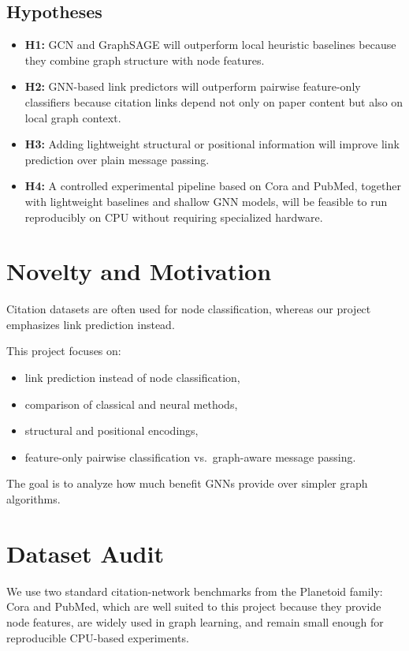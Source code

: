 \documentclass[11pt,a4paper]{article}
\begin{document}
\subsection{Hypotheses}
\begin{itemize}
    \item \textbf{H1:} GCN and GraphSAGE will outperform local heuristic baselines because they combine graph structure with node features.
    \item \textbf{H2:} GNN-based link predictors will outperform pairwise feature-only classifiers because citation links depend not only on paper content but also on local graph context.
    \item \textbf{H3:} Adding lightweight structural or positional information will improve link prediction over plain message passing.
    \item \textbf{H4:} A controlled experimental pipeline based on Cora and PubMed, together with lightweight baselines and shallow GNN models, will be feasible to run reproducibly on CPU without requiring specialized hardware.
\end{itemize}

\section{Novelty and Motivation}

Citation datasets are often used for node classification, whereas our project emphasizes link prediction instead.

This project focuses on:
\begin{itemize}
\item link prediction instead of node classification,
\item comparison of classical and neural methods,
\item structural and positional encodings,
\item feature-only pairwise classification vs.\ graph-aware message passing.
\end{itemize}

The goal is to analyze how much benefit GNNs provide
over simpler graph algorithms.

\section{Dataset Audit}

We use two standard citation-network benchmarks from the Planetoid family: Cora and PubMed, which are well suited to this project because they provide node features, are widely used in graph learning,
and remain small enough for reproducible CPU-based experiments.
\end{document}

